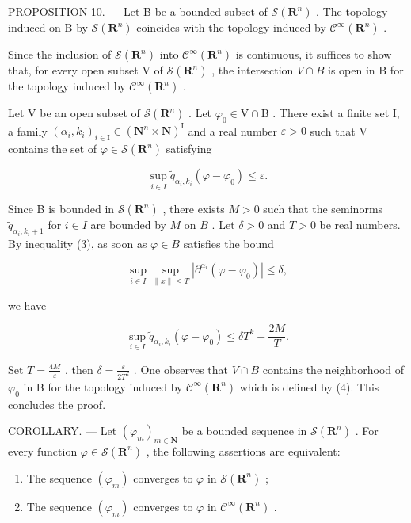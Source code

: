 PROPOSITION 10. --- Let B be a bounded subset of \(\mathcal{S}(\mathbf{R}^{n})\) . The topology induced on B by \(\mathcal{S}(\mathbf{R}^{n})\) coincides with the topology induced by \(\mathcal{C}^{\infty}(\mathbf{R}^{n})\) .

Since the inclusion of \(\mathcal{S}(\mathbf{R}^{n})\) into \(\mathcal{C}^{\infty}(\mathbf{R}^{n})\) is continuous, it suffices to show that, for every open subset V of \(\mathcal{S}(\mathbf{R}^{n})\) , the intersection \(V \cap B\) is open in B for the topology induced by \(\mathcal{C}^{\infty}(\mathbf{R}^{n})\) .

Let V be an open subset of \(\mathcal{S}(\mathbf{R}^{n})\) . Let \(\varphi_{0} \in \mathrm{V} \cap \mathrm{B}\) . There exist a finite set I, a family \((\alpha_{i}, k_{i})_{i \in \mathrm{I}} \in (\mathbf{N}^{n} \times \mathbf{N})^{\mathrm{I}}\) and a real number \(\varepsilon > 0\) such that V contains the set of \(\varphi \in \mathcal{S}(\mathbf{R}^{n})\) satisfying

\[
\sup _ {i \in I} \widetilde {q} _ {\alpha_ {i}, k _ {i}} (\varphi - \varphi_ {0}) \leqslant \varepsilon .
\]

Since B is bounded in \(\mathcal{S}(\mathbf{R}^{n})\) , there exists \(M > 0\) such that the seminorms \(\widetilde{q}_{\alpha_{i},k_{i} + 1}\) for \(i\in I\) are bounded by \(M\) on \(B\) . Let \(\delta >0\) and \(T > 0\) be real numbers. By inequality (3), as soon as \(\varphi \in B\) satisfies the bound

\[
\sup _ {i \in I} \sup _ {\| x \| \leqslant T} | \partial^ {\alpha_ {i}} (\varphi - \varphi_ {0}) | \leqslant \delta ,\tag{4}
\]

we have

\[
\sup _ {i \in I} \widetilde {q} _ {\alpha_ {i}, k _ {i}} (\varphi - \varphi_ {0}) \leqslant \delta T ^ {k} + \frac {2 M}{T}.
\]

Set \(T = \frac{4M}{\varepsilon}\) , then \(\delta = \frac{\varepsilon}{2T^{k}}\) . One observes that \(V \cap B\) contains the neighborhood of \(\varphi_{0}\) in B for the topology induced by \(\mathcal{C}^{\infty}(\mathbf{R}^{n})\) which is defined by (4). This concludes the proof.

COROLLARY. --- Let \((\varphi_{m})_{m\in\mathbf{N}}\) be a bounded sequence in \(\mathcal{S}(\mathbf{R}^{n})\) . For every function \(\varphi\in\mathcal{S}(\mathbf{R}^{n})\) , the following assertions are equivalent:

\begin{enumerate}
\def\labelenumi{\alph{enumi})}
\item
  The sequence \((\varphi_{m})\) converges to \(\varphi\) in \(\mathcal{S}(\mathbf{R}^n)\) ;
\item
  The sequence \((\varphi_{m})\) converges to \(\varphi\) in \(\mathcal{C}^{\infty}(\mathbf{R}^{n})\) .
\end{enumerate}

